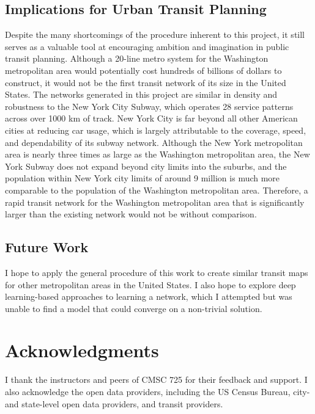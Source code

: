 \documentclass[manuscript,nonacm]{acmart}
\begin{document}
\subsection{Implications for Urban Transit Planning}
Despite the many shortcomings of the procedure inherent to this project, it still serves as a valuable tool at encouraging ambition and imagination in public transit planning. Although a 20-line metro system for the Washington metropolitan area would potentially cost hundreds of billions of dollars to construct, it would not be the first transit network of its size in the United States. The networks generated in this project are similar in density and robustness to the New York City Subway, which operates 28 service patterns across over 1000 km of track. New York City is far beyond all other American cities at reducing car usage, which is largely attributable to the coverage, speed, and dependability of its subway network. Although the New York metropolitan area is nearly three times as large as the Washington metropolitan area, the New York Subway does not expand beyond city limits into the suburbs, and the population within New York city limits of around 9 million is much more comparable to the population of the Washington metropolitan area. Therefore, a rapid transit network for the Washington metropolitan area that is significantly larger than the existing network would not be without comparison. 

\subsection{Future Work}

I hope to apply the general procedure of this work to create similar transit maps for other metropolitan areas in the United States. I also hope to explore deep learning-based approaches to learning a network, which I attempted but was unable to find a model that could converge on a non-trivial solution. 

\section{Acknowledgments}

I thank the instructors and peers of CMSC 725 for their feedback and support. I also acknowledge the open data providers, including the US Census Bureau, city- and state-level open data providers, and transit providers.



\end{document}
